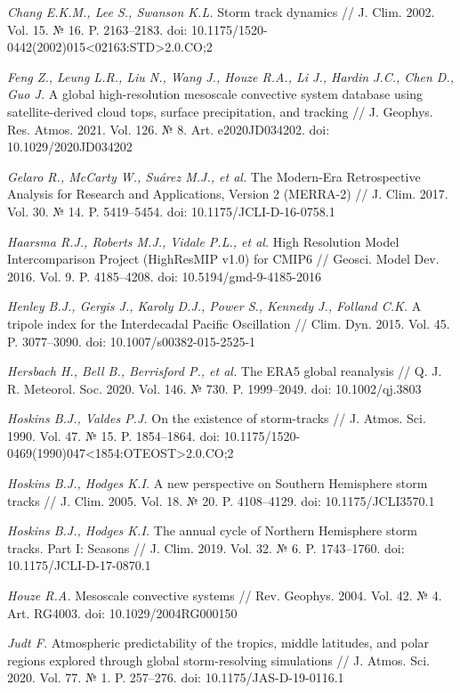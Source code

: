 \documentclass[12pt,a4paper]{article}
\begin{document}
\noindent \textit{Chang E.K.M., Lee S., Swanson K.L.} Storm track dynamics // J. Clim. 2002. Vol. 15. № 16. P. 2163–2183. doi: 10.1175/1520-0442(2002)015<02163:STD>2.0.CO;2

\noindent \textit{Feng Z., Leung L.R., Liu N., Wang J., Houze R.A., Li J., Hardin J.C., Chen D., Guo J.} A global high-resolution mesoscale convective system database using satellite-derived cloud tops, surface precipitation, and tracking // J. Geophys. Res. Atmos. 2021. Vol. 126. № 8. Art. e2020JD034202. doi: 10.1029/2020JD034202

\noindent \textit{Gelaro R., McCarty W., Suárez M.J., et al.} The Modern-Era Retrospective Analysis for Research and Applications, Version 2 (MERRA-2) // J. Clim. 2017. Vol. 30. № 14. P. 5419–5454. doi: 10.1175/JCLI-D-16-0758.1

\noindent \textit{Haarsma R.J., Roberts M.J., Vidale P.L., et al.} High Resolution Model Intercomparison Project (HighResMIP v1.0) for CMIP6 // Geosci. Model Dev. 2016. Vol. 9. P. 4185–4208. doi: 10.5194/gmd-9-4185-2016

\noindent \textit{Henley B.J., Gergis J., Karoly D.J., Power S., Kennedy J., Folland C.K.} A tripole index for the Interdecadal Pacific Oscillation // Clim. Dyn. 2015. Vol. 45. P. 3077–3090. doi: 10.1007/s00382-015-2525-1

\noindent \textit{Hersbach H., Bell B., Berrisford P., et al.} The ERA5 global reanalysis // Q. J. R. Meteorol. Soc. 2020. Vol. 146. № 730. P. 1999–2049. doi: 10.1002/qj.3803

\noindent \textit{Hoskins B.J., Valdes P.J.} On the existence of storm-tracks // J. Atmos. Sci. 1990. Vol. 47. № 15. P. 1854–1864. doi: 10.1175/1520-0469(1990)047<1854:OTEOST>2.0.CO;2

\noindent \textit{Hoskins B.J., Hodges K.I.} A new perspective on Southern Hemisphere storm tracks // J. Clim. 2005. Vol. 18. № 20. P. 4108–4129. doi: 10.1175/JCLI3570.1

\noindent \textit{Hoskins B.J., Hodges K.I.} The annual cycle of Northern Hemisphere storm tracks. Part I: Seasons // J. Clim. 2019. Vol. 32. № 6. P. 1743–1760. doi: 10.1175/JCLI-D-17-0870.1

\noindent \textit{Houze R.A.} Mesoscale convective systems // Rev. Geophys. 2004. Vol. 42. № 4. Art. RG4003. doi: 10.1029/2004RG000150

\noindent \textit{Judt F.} Atmospheric predictability of the tropics, middle latitudes, and polar regions explored through global storm-resolving simulations // J. Atmos. Sci. 2020. Vol. 77. № 1. P. 257–276. doi: 10.1175/JAS-D-19-0116.1
\end{document}
